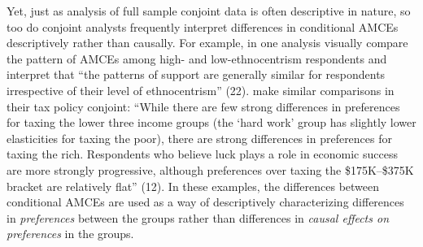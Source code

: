 \documentclass[a4paper,12pt]{article}\usepackage[]{graphicx}\usepackage[]{color}
\begin{document}
Yet, just as analysis of full sample conjoint data is often descriptive in nature, so too do conjoint analysts frequently interpret differences in conditional AMCEs descriptively rather than causally. For example, in one analysis \citet{HainmuellerHopkinsYamamoto2014} visually compare the pattern of AMCEs among high- and low-ethnocentrism respondents and interpret that ``the patterns of support are generally similar for respondents irrespective of their level of ethnocentrism'' (22). \citet{BallardRosaMartinScheve2016} make similar comparisons in their tax policy conjoint: ``While there are few strong differences in preferences for taxing the lower three income groups (the `hard work' group has slightly lower elasticities for taxing the poor), there are strong differences in preferences for taxing the rich. Respondents who believe luck plays a role in economic success are more strongly progressive, although preferences over taxing the \$175K--\$375K bracket are relatively flat'' (12). In these examples, the differences between conditional AMCEs are used as a way of descriptively characterizing differences in \textit{preferences} between the groups rather than differences in \textit{causal effects on preferences} in the groups.
\end{document}
